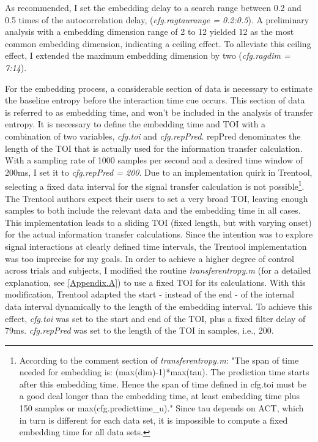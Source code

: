 As recommended, I set the embedding delay to a search range between 0.2 and 0.5 times of the autocorrelation delay, (\emph{cfg.ragtaurange = 0.2:0.5}).
A preliminary analysis with a embedding dimension range of 2 to 12 yielded 12 as the most common embedding dimension, indicating a ceiling effect.
To alleviate this ceiling effect, I extended the maximum embedding dimension by two (\emph{cfg.ragdim = 7:14}).

For the embedding process, a considerable section of data is necessary to estimate the baseline entropy before the interaction time cue occurs.
This section of data is referred to as embedding time, and won't be included in the analysis of transfer entropy.
It is necessary to define the embedding time and TOI with a combination of two variables, \emph{cfg.toi} and \emph{cfg.repPred}.
repPred denominates the length of the TOI that is actually used for the information transfer calculation.
With a sampling rate of 1000 samples per second and a desired time window of 200ms, I set it to \emph{cfg.repPred = 200}.
Due to an implementation quirk in Trentool, selecting a fixed data interval for the signal transfer calculation is not possible\footnote{According to the comment section of \emph{transferentropy.m}: "The span of time needed for embedding is: (max(dim)-1)*max(tau). The prediction time starts after this embedding time. Hence the span of time defined in cfg.toi must be a good deal longer than the embedding time, at least embedding time plus 150 samples or max(cfg.predicttime_u)."
Since tau depends on ACT, which in turn is different for each data set, it is impossible to compute a fixed embedding time for all data sets.}. The Trentool authors expect their users to set a very broad TOI, leaving enough samples to both include the relevant data and the embedding time in all cases.
This implementation leads to a sliding TOI (fixed length, but with varying onset) for the actual information transfer calculations.
Since the intention was to explore signal interactions at clearly defined time intervals, the Trentool implementation was too imprecise for my goals.
In order to achieve a higher degree of control across trials and subjects, I modified the routine \emph{transferentropy.m} (for a detailed explanation, see \ref{Appendix.A}) to use a fixed TOI for its calculations.
With this modification, Trentool adapted the start - instead of the end - of the internal data interval dynamically to the length of the embedding interval.
To achieve this effect, \emph{cfg.toi} was set to the start and end of the TOI, plus a fixed filter delay of 79ms.
\emph{cfg.repPred} was set to the length of the TOI in samples, i.e., 200.

